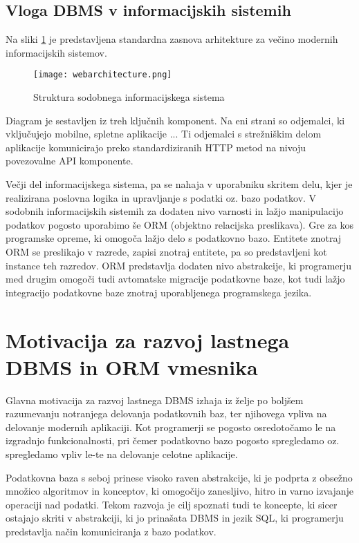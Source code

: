 \documentclass[a4paper,12pt,openright]{book}
\begin{document}
    \subsection{Vloga DBMS v informacijskih sistemih}

    Na sliki \ref{infsistem} je predstavljena standardna zasnova arhitekture za večino modernih informacijskih sistemov.
    \begin{figure}[h]
        \centerline{\texttt{[image: webarchitecture.png]}}
        \caption{Struktura sodobnega informacijskega sistema}
        \label{infsistem}
    \end{figure}

    \noindent
    Diagram je sestavljen iz treh ključnih komponent. Na eni strani so odjemalci, ki vključujejo mobilne, spletne aplikacije  ... Ti odjemalci s strežniškim delom aplikacije komunicirajo preko standardiziranih HTTP metod na nivoju povezovalne API komponente.

    Večji del informacijskega sistema, pa se nahaja v uporabniku skritem delu, kjer je realizirana poslovna logika in upravljanje s podatki oz. bazo podatkov. V sodobnih informacijskih sistemih za dodaten nivo varnosti in lažjo manipulacijo podatkov pogosto uporabimo še ORM (objektno relacijska preslikava). Gre za kos programske opreme, ki omogoča lažjo delo s podatkovno bazo. Entitete znotraj ORM se preslikajo v razrede, zapisi znotraj entitete, pa so predstavljeni kot instance teh razredov. ORM predstavlja dodaten nivo abstrakcije, ki programerju med drugim omogoči tudi avtomatske migracije podatkovne baze, kot tudi lažjo integracijo podatkovne baze znotraj uporabljenega programskega jezika.

    \section{Motivacija za razvoj lastnega DBMS in ORM vmesnika}
    Glavna motivacija za razvoj lastnega DBMS izhaja iz želje po boljšem razumevanju notranjega delovanja podatkovnih baz, ter njihovega vpliva na delovanje modernih aplikaciji. Kot programerji se pogosto osredotočamo le na izgradnjo funkcionalnosti, pri čemer podatkovno bazo pogosto spregledamo oz. spregledamo vpliv le-te na delovanje celotne aplikacije.
    
    Podatkovna baza s seboj prinese visoko raven abstrakcije, ki je podprta z obsežno množico algoritmov in konceptov, ki omogočijo zanesljivo, hitro in varno izvajanje operaciji nad podatki. Tekom razvoja je cilj spoznati tudi te koncepte, ki sicer ostajajo skriti v abstrakciji, ki jo prinašata DBMS in jezik SQL, ki programerju predstavlja način komuniciranja z bazo podatkov.
\end{document}
